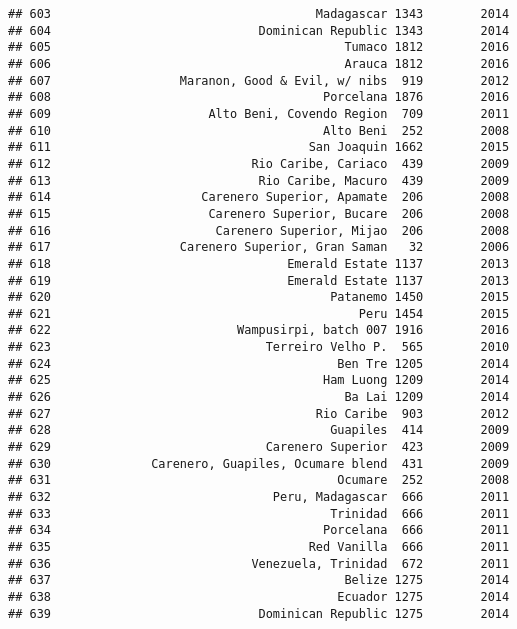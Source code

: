 \documentclass[
]{article}
\begin{document}
\begin{verbatim}
## 603                                     Madagascar 1343        2014
## 604                             Dominican Republic 1343        2014
## 605                                         Tumaco 1812        2016
## 606                                         Arauca 1812        2016
## 607                  Maranon, Good & Evil, w/ nibs  919        2012
## 608                                      Porcelana 1876        2016
## 609                      Alto Beni, Covendo Region  709        2011
## 610                                      Alto Beni  252        2008
## 611                                    San Joaquin 1662        2015
## 612                            Rio Caribe, Cariaco  439        2009
## 613                             Rio Caribe, Macuro  439        2009
## 614                     Carenero Superior, Apamate  206        2008
## 615                      Carenero Superior, Bucare  206        2008
## 616                       Carenero Superior, Mijao  206        2008
## 617                  Carenero Superior, Gran Saman   32        2006
## 618                                 Emerald Estate 1137        2013
## 619                                 Emerald Estate 1137        2013
## 620                                       Patanemo 1450        2015
## 621                                           Peru 1454        2015
## 622                          Wampusirpi, batch 007 1916        2016
## 623                              Terreiro Velho P.  565        2010
## 624                                        Ben Tre 1205        2014
## 625                                      Ham Luong 1209        2014
## 626                                         Ba Lai 1209        2014
## 627                                     Rio Caribe  903        2012
## 628                                       Guapiles  414        2009
## 629                              Carenero Superior  423        2009
## 630              Carenero, Guapiles, Ocumare blend  431        2009
## 631                                        Ocumare  252        2008
## 632                               Peru, Madagascar  666        2011
## 633                                       Trinidad  666        2011
## 634                                      Porcelana  666        2011
## 635                                    Red Vanilla  666        2011
## 636                            Venezuela, Trinidad  672        2011
## 637                                         Belize 1275        2014
## 638                                        Ecuador 1275        2014
## 639                             Dominican Republic 1275        2014

\end{verbatim}
\end{document}
